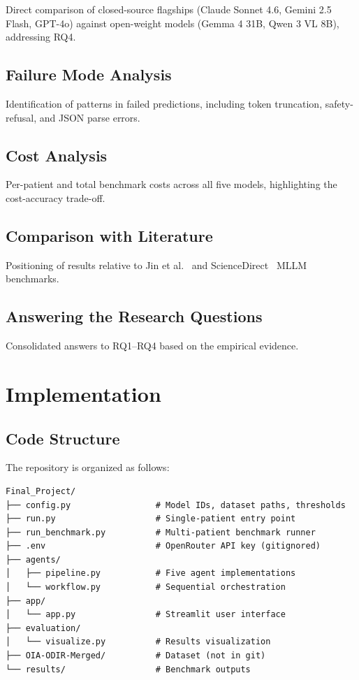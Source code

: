 \documentclass[11pt,a4paper]{article}
\begin{document}
Direct comparison of closed-source flagships (Claude Sonnet 4.6, Gemini 2.5 Flash, GPT-4o) against open-weight models (Gemma 4 31B, Qwen 3 VL 8B), addressing RQ4.

\subsection{Failure Mode Analysis}

Identification of patterns in failed predictions, including token truncation, safety-refusal, and JSON parse errors.

\subsection{Cost Analysis}

Per-patient and total benchmark costs across all five models, highlighting the cost-accuracy trade-off.

\subsection{Comparison with Literature}

Positioning of results relative to Jin et al.~\cite{jin2025mllm} and ScienceDirect~\cite{sciencedirect2024} MLLM benchmarks.

\subsection{Answering the Research Questions}

Consolidated answers to RQ1--RQ4 based on the empirical evidence.

\section{Implementation}

\subsection{Code Structure}

The repository is organized as follows:

\begin{lstlisting}[basicstyle=\ttfamily\footnotesize]
Final_Project/
├── config.py                 # Model IDs, dataset paths, thresholds
├── run.py                    # Single-patient entry point
├── run_benchmark.py          # Multi-patient benchmark runner
├── .env                      # OpenRouter API key (gitignored)
├── agents/
│   ├── pipeline.py           # Five agent implementations
│   └── workflow.py           # Sequential orchestration
├── app/
│   └── app.py                # Streamlit user interface
├── evaluation/
│   └── visualize.py          # Results visualization
├── OIA-ODIR-Merged/          # Dataset (not in git)
└── results/                  # Benchmark outputs
\end{lstlisting}
\end{document}
